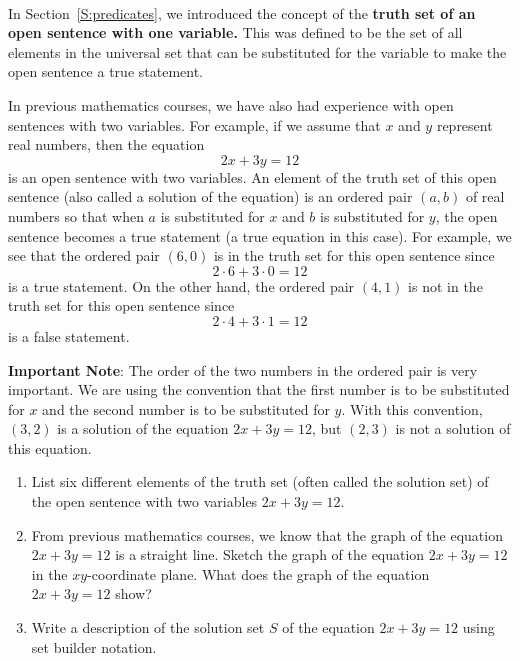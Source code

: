 \begin{previewactivity} \label{PA:equationwith2vars} \hfill \\
In Section~\ref{S:predicates}, we introduced the concept of the \textbf{truth set of an open sentence with one variable.}
%
  This was defined to be the set of all elements in the universal set that can be substituted for the variable to make the open sentence a true statement.

In previous mathematics courses, we have also had experience with open sentences with two variables.  For example, if we assume that  $x$  and  $y$  represent real numbers, then the equation 
\[
2x + 3y = 12
\]
is an open sentence with two variables.  An element of the truth set of this open sentence (also called a solution of the equation) is an ordered pair  $\left( {a,b} \right)$ of real numbers so that when  $a$  is substituted for  $x$  and  $b$  is substituted for  $y$, the open sentence becomes a true statement (a true equation in this case).  For example, we see that the ordered pair $(6, 0)$ is in the truth set for this open sentence since
\[
2 \cdot 6 + 3 \cdot 0 = 12
\]
is a true statement.  On the other hand, the ordered pair $(4, 1)$ is not in the truth set for this open sentence since
\[
2 \cdot 4 + 3 \cdot 1 = 12
\]
is a false statement.

\noindent
\textbf{Important Note}: The order of the  two numbers in the ordered pair is very important.  We are using the convention that the first number is to be substituted for $x$ and the second number is to be substituted for $y$.  With this convention, $\left( 3, 2 \right)$ is a solution of the equation $2x + 3y = 12$, but $\left( 2, 3 \right)$ is not a solution of this equation.

\begin{enumerate}
\item List six different elements of the truth set (often called the solution set) of the open sentence 
 with two variables $2x + 3y = 12$.

\item From previous mathematics courses, we know that the graph of the equation $2x + 3y = 12$ is a straight line.  Sketch the graph of the equation  $2x + 3y = 12$ in the $xy$-coordinate plane.  What does the graph of the equation  $2x + 3y = 12$ show?

\item Write a description of the solution set  $S$  of the equation  $2x + 3y = 12$ using set builder notation.

\end{enumerate}
\end{previewactivity}
\hbreak

\endinput
